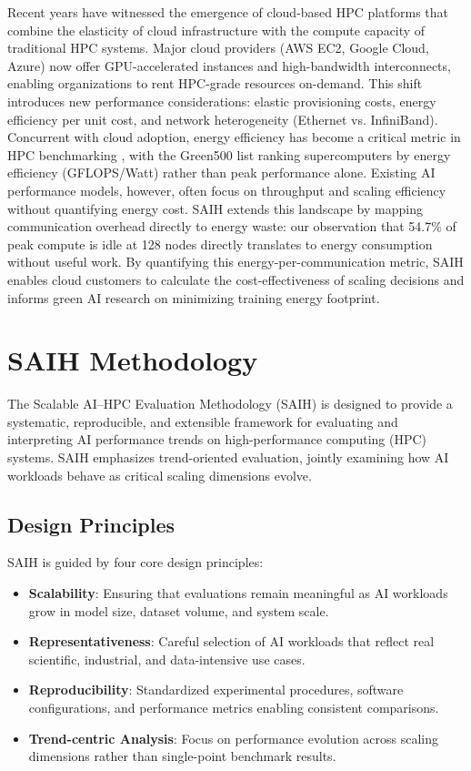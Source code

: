 \documentclass{llncs}
\begin{document}
Recent years have witnessed the emergence of cloud-based HPC platforms that combine the elasticity of cloud infrastructure with the compute capacity of traditional HPC systems. Major cloud providers (AWS EC2, Google Cloud, Azure) now offer GPU-accelerated instances and high-bandwidth interconnects, enabling organizations to rent HPC-grade resources on-demand. This shift introduces new performance considerations: elastic provisioning costs, energy efficiency per unit cost, and network heterogeneity (Ethernet vs. InfiniBand). Concurrent with cloud adoption, energy efficiency has become a critical metric in HPC benchmarking \cite{Green5002023}, with the Green500 list ranking supercomputers by energy efficiency (GFLOPS/Watt) rather than peak performance alone. Existing AI performance models, however, often focus on throughput and scaling efficiency without quantifying energy cost. SAIH extends this landscape by mapping communication overhead directly to energy waste: our observation that 54.7\% of peak compute is idle at 128 nodes directly translates to energy consumption without useful work. By quantifying this energy-per-communication metric, SAIH enables cloud customers to calculate the cost-effectiveness of scaling decisions and informs green AI research on minimizing training energy footprint.

\section{SAIH Methodology}

The Scalable AI--HPC Evaluation Methodology (SAIH) is designed to provide a systematic, reproducible, and extensible framework for evaluating and interpreting AI performance trends on high-performance computing (HPC) systems. SAIH emphasizes trend-oriented evaluation, jointly examining how AI workloads behave as critical scaling dimensions evolve.

\subsection{Design Principles}

SAIH is guided by four core design principles:

\begin{itemize}
    \item \textbf{Scalability}: Ensuring that evaluations remain meaningful as AI workloads grow in model size, dataset volume, and system scale.
    \item \textbf{Representativeness}: Careful selection of AI workloads that reflect real scientific, industrial, and data-intensive use cases.
    \item \textbf{Reproducibility}: Standardized experimental procedures, software configurations, and performance metrics enabling consistent comparisons.
    \item \textbf{Trend-centric Analysis}: Focus on performance evolution across scaling dimensions rather than single-point benchmark results.
\end{itemize}
\end{document}
